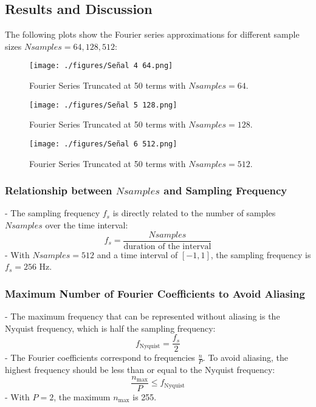 \documentclass[10pt]{article}
\theoremstyle{definition}
\theoremstyle{remark}
\theoremstyle{definition}
\numberwithin{equation}{prob}
\begin{document}
\subsection*{Results and Discussion}

The following plots show the Fourier series approximations for different sample sizes \( Nsamples = 64, 128, 512 \):

\begin{figure}[h!]
    \centering
    \texttt{[image: ./figures/Señal 4 64.png]}
    \caption{Fourier Series Truncated at 50 terms with \( Nsamples = 64 \).}
\end{figure}

\begin{figure}[h!]
    \centering
    \texttt{[image: ./figures/Señal 5 128.png]}
    \caption{Fourier Series Truncated at 50 terms with \( Nsamples = 128 \).}
\end{figure}

\begin{figure}[h!]
    \centering
    \texttt{[image: ./figures/Señal 6 512.png]}
    \caption{Fourier Series Truncated at 50 terms with \( Nsamples = 512 \).}
\end{figure}

\subsubsection*{Relationship between \( Nsamples \) and Sampling Frequency}

- The sampling frequency \( f_s \) is directly related to the number of samples \( Nsamples \) over the time interval:
  \[
  f_s = \frac{Nsamples}{\text{duration of the interval}}
  \]
- With \( Nsamples = 512 \) and a time interval of \([-1, 1]\), the sampling frequency is \( f_s = 256 \) Hz.

\subsubsection*{Maximum Number of Fourier Coefficients to Avoid Aliasing}

- The maximum frequency that can be represented without aliasing is the Nyquist frequency, which is half the sampling frequency:
  \[
  f_{\text{Nyquist}} = \frac{f_s}{2}
  \]
- The Fourier coefficients correspond to frequencies \( \frac{n}{P} \). To avoid aliasing, the highest frequency should be less than or equal to the Nyquist frequency:
  \[
  \frac{n_{\text{max}}}{P} \leq f_{\text{Nyquist}}
  \]
- With \( P = 2 \), the maximum \( n_{\text{max}} \) is 255.
\end{document}
